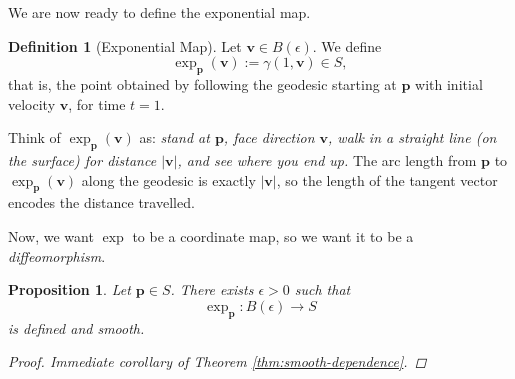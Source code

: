 \documentclass[10pt, a4paper]{article}
\theoremstyle{plain}
\newtheorem{proposition}[theorem]{Proposition}
\theoremstyle{definition}
\newtheorem{definition}[theorem]{Definition}
\theoremstyle{remark}
\newenvironment{sidenote}{%
  \par\vspace{0.5em}%
  \noindent\color{defcolor}%
}{%
  \par\vspace{0.5em}%
  \color{black}%
}
\begin{document}
We are now ready to define the exponential map.

\begin{definition}[Exponential Map]\label{def:exp-map}
    Let $\mathbf{v} \in B(\epsilon)$. We define
    \[
        \exp_\mathbf{p}(\mathbf{v}) := \gamma(1, \mathbf{v}) \in S,
    \]
    that is, the point obtained by following the geodesic starting at $\mathbf{p}$ 
    with initial velocity $\mathbf{v}$, for time $t = 1$.
\end{definition}

\begin{sidenote}
    Think of $\exp_\mathbf{p}(\mathbf{v})$ as: \textit{stand at $\mathbf{p}$, face 
    direction $\mathbf{v}$, walk in a straight line (on the surface) for distance 
    $|\mathbf{v}|$, and see where you end up.} The arc length from $\mathbf{p}$ to 
    $\exp_\mathbf{p}(\mathbf{v})$ along the geodesic is exactly $|\mathbf{v}|$, so 
    the length of the tangent vector encodes the distance travelled.
\end{sidenote}

Now, we want $\exp$ to be a coordinate map, so we want it to be a \textit{diffeomorphism}.

\begin{proposition}\label{prop:exp-smooth}
    Let $\mathbf{p} \in S$. There exists $\epsilon > 0$ such that
    \[
        \exp_\mathbf{p}: B(\epsilon) \to S
    \]
    is defined and smooth.

    \begin{proof}
        Immediate corollary of Theorem \ref{thm:smooth-dependence}.
    \end{proof}
\end{proposition}
\end{document}

